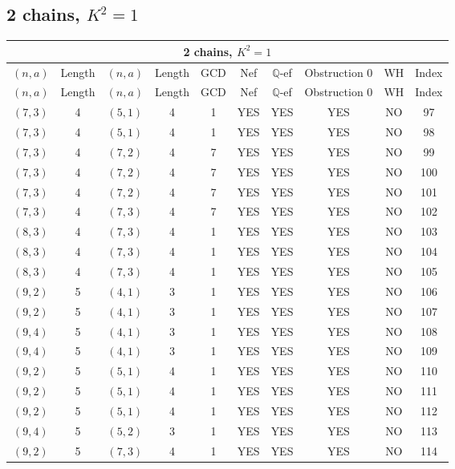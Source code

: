 \subsection{2 chains, $K^2 = 1$}
\begin{longtable}{|c|c|c|c|c|c|c|c|c|c|}
\hline
\multicolumn{10}{|c|}{2 chains, $K^2 = 1$}\\
\hline
$(n,a)$ & Length & $(n,a)$ & Length & GCD & Nef & $\mathbb Q$-ef & Obstruction 0 & WH & Index\\
\hline
\endfirsthead

\hline
$(n,a)$ & Length & $(n,a)$ & Length & GCD & Nef & $\mathbb Q$-ef & Obstruction 0 & WH & Index\\
\hline
\endhead
\hline
\endfoot

$(7, 3)$ & 4 & $(5, 1)$ & 4 & 1 & YES & YES & YES & NO & 97\\
$(7, 3)$ & 4 & $(5, 1)$ & 4 & 1 & YES & YES & YES & NO & 98\\
$(7, 3)$ & 4 & $(7, 2)$ & 4 & 7 & YES & YES & YES & NO & 99\\
$(7, 3)$ & 4 & $(7, 2)$ & 4 & 7 & YES & YES & YES & NO & 100\\
$(7, 3)$ & 4 & $(7, 2)$ & 4 & 7 & YES & YES & YES & NO & 101\\
$(7, 3)$ & 4 & $(7, 3)$ & 4 & 7 & YES & YES & YES & NO & 102\\
$(8, 3)$ & 4 & $(7, 3)$ & 4 & 1 & YES & YES & YES & NO & 103\\
$(8, 3)$ & 4 & $(7, 3)$ & 4 & 1 & YES & YES & YES & NO & 104\\
$(8, 3)$ & 4 & $(7, 3)$ & 4 & 1 & YES & YES & YES & NO & 105\\
$(9, 2)$ & 5 & $(4, 1)$ & 3 & 1 & YES & YES & YES & NO & 106\\
$(9, 2)$ & 5 & $(4, 1)$ & 3 & 1 & YES & YES & YES & NO & 107\\
$(9, 4)$ & 5 & $(4, 1)$ & 3 & 1 & YES & YES & YES & NO & 108\\
$(9, 4)$ & 5 & $(4, 1)$ & 3 & 1 & YES & YES & YES & NO & 109\\
$(9, 2)$ & 5 & $(5, 1)$ & 4 & 1 & YES & YES & YES & NO & 110\\
$(9, 2)$ & 5 & $(5, 1)$ & 4 & 1 & YES & YES & YES & NO & 111\\
$(9, 2)$ & 5 & $(5, 1)$ & 4 & 1 & YES & YES & YES & NO & 112\\
$(9, 4)$ & 5 & $(5, 2)$ & 3 & 1 & YES & YES & YES & NO & 113\\
$(9, 2)$ & 5 & $(7, 3)$ & 4 & 1 & YES & YES & YES & NO & 114\\

\end{longtable}
